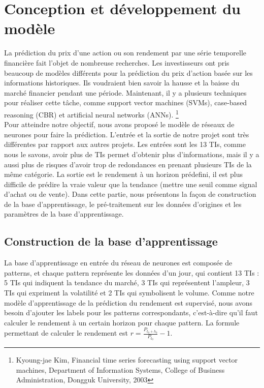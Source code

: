 

\section{Conception et développement du modèle}

La prédiction du prix d'une action ou son rendement par une série temporelle financière fait l'objet de nombreuse recherches. Les investisseurs ont pris beaucoup de modèles différents pour la prédiction du prix d'action basée sur les informations historiques. Ils voudraient bien savoir la hausse et la baisse du marché financier pendant une période. Maintenant, il y a plusieurs techniques pour réaliser cette tâche, comme support vector machines (SVMs), case-based reasoning (CBR) et artificial neural networks (ANNs). \footnote{Kyoung-jae Kim, Financial time series forecasting using support vector machines, Department of Information Systems, College of Business Administration, Dongguk University, 2003} \\

Pour atteindre notre objectif, nous avons proposé le modèle de réseaux de neurones pour faire la prédiction. L’entrée et la sortie de notre projet sont très différentes par rapport aux autres projets. Les entrées sont les 13 TIs, comme nous le savons, avoir plus de TIs permet d'obtenir plus d’informations, mais il y a aussi plus de risques d’avoir trop de redondances en prenant plusieurs TIs de la même catégorie. La sortie est le rendement à un horizon prédefini, il est plus difficile de prédire la vraie valeur que la tendance (mettre une seuil comme signal d’achat ou de vente). Dans cette partie, nous présentons la façon de construction de la base d'apprentissage, le pré-traitement sur les données d'origines et les paramètres de la base d'apprentissage. 

\subsection{Construction de la base d’apprentissage}

La base d'apprentissage en entrée du réseau de neurones est composée de patterns, et chaque pattern représente les données d'un jour, qui contient 13 TIs : 5 TIs qui indiquent la tendance du marché, 3 TIs qui représentent l'ampleur, 3 TIs qui expriment la volatilité et 2 TIs qui symbolisent le volume. Comme notre modèle d'apprentissage de la prédiction du rendement est supervisé, nous avons besoin d’ajouter les labels pour les patterns correspondants, c’est-à-dire qu'il faut calculer le rendement à un certain horizon pour chaque pattern. La formule permettant de calculer le rendement est $ r = \frac{P_{t_{0}+h_{0}}}{P_{t_{0}}} - 1 $.


